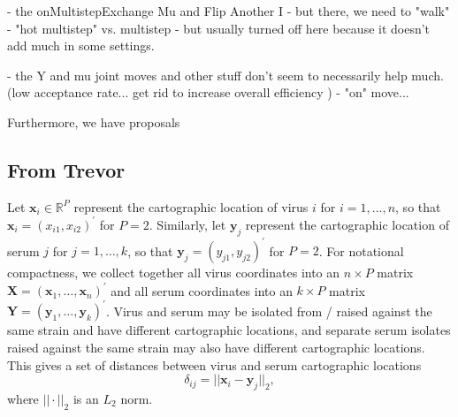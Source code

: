 \documentclass[11pt,oneside,letterpaper]{article}
\newcommand{\virus}{\mathbf{x}}						%
\newcommand{\serum}{\mathbf{y}}						%
\newcommand{\viruses}{\mathbf{X}}					%
\newcommand{\sera}{\mathbf{Y}}						%
\newcommand{\vn}{n}									%
\newcommand{\sn}{k}									%
\begin{document}
     - the onMultistepExchange Mu and Flip Another I
	- but there, we need to "walk"
    - "hot multistep" vs. multistep
	    - but usually turned off here because it doesn't add much in some settings.

    - the Y and mu joint moves and other stuff don't seem to necessarily help much. (low acceptance rate... get rid to increase overall efficiency )
    - "on" move...



Furthermore, we have proposals 

\subsection*{From Trevor}


Let $\virus_i \in \mathbb{R}^{P}$ represent the cartographic location of virus $i$ for $i = 1,\ldots,\vn$, so that $\virus_i = (x_{i1}, x_{i2})^{\prime}$ for $P=2$. 
Similarly, let $\serum_j$ represent the cartographic location of serum $j$ for $j = 1,\ldots,\sn$, so that $\serum_j = (y_{j1},y_{j2})^{\prime}$ for $P=2$.
For notational compactness, we collect together all virus coordinates into an $\vn \times P$ matrix  $\viruses = (\virus_1, \ldots, \virus_{\vn})^{\prime}$ and all serum coordinates into an $\sn \times P$ matrix $\sera = (\serum_{1},\ldots,\serum_{\sn})^{\prime}$.
Virus and serum may be isolated from / raised against the same strain and have different cartographic locations, and separate serum isolates raised against the same strain may also have different cartographic locations. 
This gives a set of distances between virus and serum cartographic locations 
\begin{equation}
	\delta_{ij} =  || \virus_i - \serum_j ||_2,
\end{equation}
where $|| \cdot ||_2$ is an $L_2$ norm.
\end{document}
